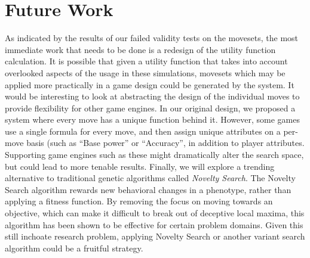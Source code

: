 \documentclass{acm_proc_article-sp}
\begin{document}
\section{Future Work}
As indicated by the results of our failed validity tests on the movesets, the most immediate work that needs to be done is a redesign of the utility function calculation. It is possible that given a utility function that takes into account overlooked aspects of the usage in these simulations, movesets which may be applied more practically in a game design could be generated by the system.
It would be interesting to look at abstracting the design of the individual moves to provide flexibility for other game engines. In our original design, we proposed a system where every move has a unique function behind it. However, some games use a single formula for every move, and then assign unique attributes on a per-move basis (such as “Base power” or “Accuracy”, in addition to player attributes. Supporting game engines such as these might dramatically alter the search space, but could lead to more tenable results.
Finally, we will explore a trending alternative to traditional genetic algorithms called \textit{Novelty Search}. The Novelty Search algorithm rewards new behavioral changes in a phenotype, rather than applying a fitness function. By removing the focus on moving towards an objective, which can make it difficult to break out of deceptive local maxima, this algorithm has been shown to be effective for certain problem domains. Given this still inchoate research problem, applying Novelty Search or another variant search algorithm could be a fruitful strategy.

%


\begin{thebibliography}{1}


\end{thebibliography}


\balancecolumns
\end{document}
